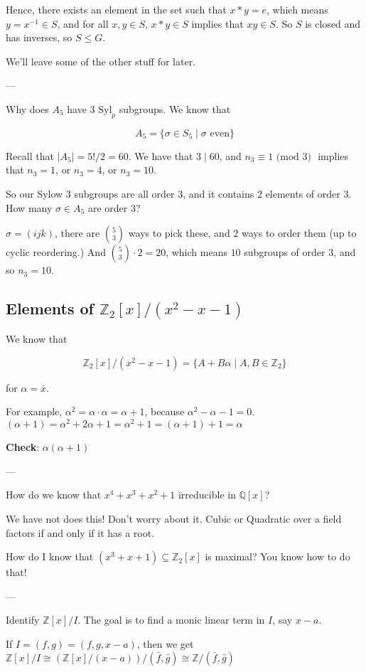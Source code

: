 \documentclass[12pt]{article}
\def\Syl{\text{Syl}}
\def\Z{{\mathbb Z}}
\def\Q{{\mathbb Q}}
\renewcommand{\mod}[1]{\text{ (mod $#1$) }}
\theoremstyle{remark}
\theoremstyle{remark}
\theoremstyle{remark}
\theoremstyle{remark}
\theoremstyle{remark}
\begin{document}
Hence, there exists an element in the set such that $x * y = e$, which means $y
= x^{-1} \in S$, and for all $x, y \in S$, $x * y \in S$ implies that $xy \in
S$. So $S$ is closed and has inverses, so $S \le G$.

We'll leave some of the other stuff for later.

---

Why does $A_5$ have $3$ $\Syl_p$ subgroups. We know that

\[
  A_5 = \{\sigma \in S_5 \mid \sigma \text{ even}\}
\]

Recall that $|A_5| = 5! / 2 = 60$. We have that $3 \mid 60$, and $n_3 \equiv 1
\mod 3$ implies that $n_3 = 1$, or $n_3 = 4$, or $n_3 = 10$.

So our Sylow $3$ subgroups are all order $3$, and it contains $2$ elements of
order $3$. How many $\sigma \in A_5$ are order $3$?

$\sigma = (ijk)$, there are $\binom{5}{3}$ ways to pick these, and $2$ ways to
order them (up to cyclic reordering.) And $\binom{5}{3} \cdot 2 = 20$, which
means $10$ subgroups of order $3$, and so $n_3 = 10$.

\subsection{Elements of $\Z_2[x] / (x^2 - x - 1)$}

We know that

\[
  \Z_2[x] / (x^2 - x - 1) = \{A + B\alpha \mid A, B \in \Z_2\}
\]

for $\alpha = \bar x$.

For example, $\alpha^2 = \alpha \cdot \alpha = \alpha + 1$, because $\alpha^2 -
\alpha - 1 = 0$. $(\alpha + 1) = \alpha^2 + 2 \alpha + 1 = \alpha^2 + 1 =
(\alpha + 1) + 1 = \alpha$

{\bf Check}: $\alpha(\alpha + 1)$

---

How do we know that $x^4 + x^3 + x^2 + 1$ irreducible in $\Q[x]$?

We have not does this! Don't worry about it. Cubic or Quadratic over a field
factors if and only if it has a root.

How do I know that $(x^3 + x + 1) \subseteq \Z_2[x]$ is maximal? You know how to
do that!

---

Identify $\Z[x] / I$. The goal is to find a monic linear term in $I$, say $x -
a$.

If $I = (f, g) = (f, g, x - a)$, then we get $\Z[x] / I \cong (\Z[x] / (x - a))
/ (\bar f, \bar g) \cong \Z / (\bar f, \bar g)$
\end{document}
